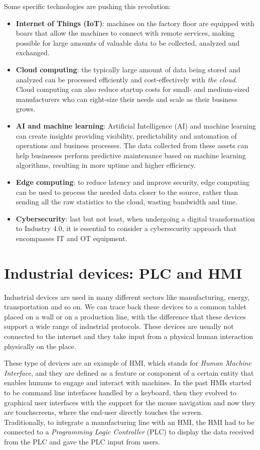 Some specific technologies are pushing this revolution:~\cite{what-is-industry-4-0}
\begin{itemize}
  \item \textbf{Internet of Things (IoT)}: machines on the factory floor are equipped with boars that allow the machines to connect with remote services, making possible for large amounts of valuable data to be collected, analyzed and exchanged.
  \item \textbf{Cloud computing}: the typically large amount of data being stored and analyzed can be processed efficiently and cost-effectively with \textit{the cloud}. Cloud computing can also reduce startup costs for small- and medium-sized manufacturers who can right-size their needs and scale as their business grows.
  \item \textbf{AI and machine learning}: Artificial Intelligence (AI) and machine learning can create insights providing visibility, predictability and automation of operations and business processes. The data collected from these assets can help businesses perform predictive maintenance based on machine learning algorithms, resulting in more uptime and higher efficiency.
  \item \textbf{Edge computing}: to reduce latency and improve security, edge computing can be used to process the needed data closer to the source, rather than sending all the raw statistics to the cloud, wasting bandwidth and time.
  \item \textbf{Cybersecurity}: last but not least, when undergoing a digital transformation to Industry 4.0, it is essential to consider a cybersecurity approach that encompasses IT and OT equipment.
\end{itemize}

\section{Industrial devices: PLC and HMI}

Industrial devices are used in many different sectors like manufacturing, energy, transportation and so on. We can trace back these devices to a common tablet placed on a wall or on a production line, with the difference that these devices support a wide range of industrial protocols. These devices are usually not connected to the internet and they take input from a physical human interaction physically on the place.

These type of devices are an example of HMI, which stands for \textit{Human Machine Interface}, and they are defined as a feature or component of a certain entity that enables humans to engage and interact with machines. In the past HMIs started to be command line interfaces handled by a keyboard, then they evolved to graphical user interfaces with the support for the mouse navigation and now they are touchscreens, where the end-user directly touches the screen.\\
Traditionally, to integrate a manufacturing line with an HMI, the HMI had to be connected to a \textit{Programming Logic Controller} (PLC) to display the data received from the PLC and gave the PLC input from users.~\cite{what-is-hmi}

